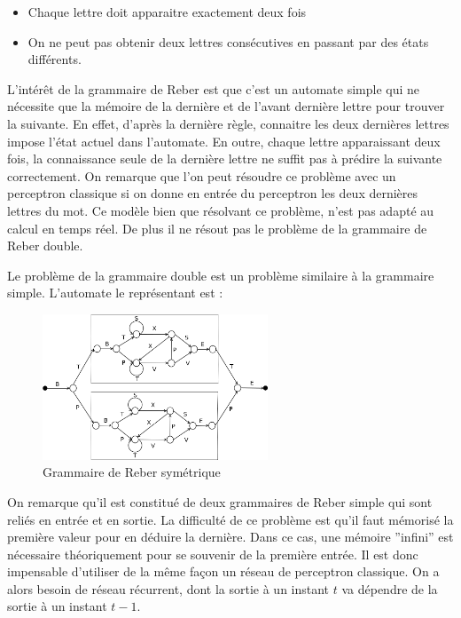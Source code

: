 \medskip

\begin{itemize}
	\item Chaque lettre doit apparaitre exactement deux fois
	\item On ne peut pas obtenir deux lettres consécutives en passant par des états différents.
\end{itemize}

\medskip

L'intérêt de la grammaire de Reber est que c'est un automate simple qui ne nécessite que la mémoire de la dernière et de l'avant dernière lettre pour trouver la suivante.
En effet, d'après la dernière règle, connaitre les deux dernières lettres impose l'état actuel dans l'automate.
En outre, chaque lettre apparaissant deux fois, la connaissance seule de la dernière lettre ne suffit pas à prédire la suivante correctement.
On remarque que l'on peut résoudre ce problème avec un perceptron classique si on donne en entrée du perceptron les deux dernières lettres du mot.
Ce modèle bien que résolvant ce problème, n'est pas adapté au calcul en temps réel.
De plus il ne résout pas le problème de la grammaire de Reber double.

\medskip

Le problème de la grammaire double est un problème similaire à la grammaire
simple. L'automate le représentant est :

\begin{figure}[!ht]
\begin{center}
\includegraphics[width=0.6\textwidth]{images/reberGrammarSymmetric.png}
\end{center}
\caption{Grammaire de Reber symétrique}
\end{figure}

On remarque qu'il est constitué de deux grammaires de Reber simple qui sont reliés en entrée et en sortie.
La difficulté de ce problème est qu'il faut mémorisé la première valeur pour en déduire la dernière.
Dans ce cas, une mémoire ''infini'' est nécessaire théoriquement pour se souvenir de la première entrée.
Il est donc impensable d'utiliser de la même façon un réseau de perceptron classique. On a alors besoin de réseau récurrent, dont la sortie à un instant $t$ va dépendre de la sortie à un instant $t-1$.

